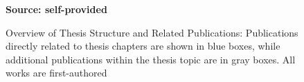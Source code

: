 \begin{figure}[ht!]
\centering
\caption{\textmd{Overview of Thesis Structure and Related Publications: Publications directly related to thesis chapters are shown in blue boxes, while additional publications within the thesis topic are in gray boxes. All works are first-authored}}
\label{fig:thesis_flow}
\par\medskip\ABNTEXfontereduzida\selectfont\textbf{Source: self-provided}  
\par\medskip
\end{figure}